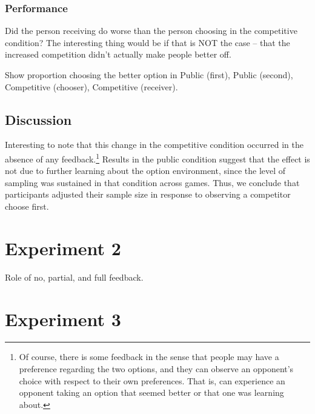 \documentclass[11pt,jou]{apa6}
\begin{document}
\subsubsection{Performance}

Did the person receiving do worse than the person choosing in the competitive condition? The interesting thing would be if that is NOT the case -- that the increased competition didn't actually make people better off.

Show proportion choosing the better option in Public (first), Public (second), Competitive (chooser), Competitive (receiver).

\subsection{Discussion}

Interesting to note that this change in the competitive condition occurred in the absence of any feedback.\footnote{Of course, there is some feedback in the sense that people may have a preference regarding the two options, and they can observe an opponent's choice with respect to their own preferences. That is, can experience an opponent taking an option that seemed better or that one was learning about.}
Results in the public condition suggest that the effect is not due to further learning about the option environment, since the level of sampling was sustained in that condition across games.
Thus, we conclude that participants adjusted their sample size in response to observing a competitor choose first.


\section{Experiment 2}

Role of no, partial, and full feedback.



\section{Experiment 3}




\end{document}
